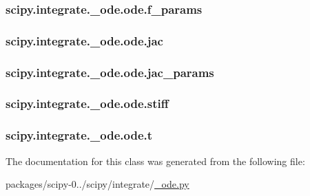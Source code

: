 \subsubsection[{f\+\_\+params}]{\setlength{\rightskip}{0pt plus 5cm}scipy.\+integrate.\+\_\+ode.\+ode.\+f\+\_\+params}\label{classscipy_1_1integrate_1_1__ode_1_1ode_a43a6b1b3c7f876449e3721dce0c58296}
\hypertarget{classscipy_1_1integrate_1_1__ode_1_1ode_ae8cbb591c6c002c709eb845b3b8188bd}{}
\subsubsection[{jac}]{\setlength{\rightskip}{0pt plus 5cm}scipy.\+integrate.\+\_\+ode.\+ode.\+jac}\label{classscipy_1_1integrate_1_1__ode_1_1ode_ae8cbb591c6c002c709eb845b3b8188bd}
\hypertarget{classscipy_1_1integrate_1_1__ode_1_1ode_a73985726afe87adb6139fcd1a6a3ade8}{}
\subsubsection[{jac\+\_\+params}]{\setlength{\rightskip}{0pt plus 5cm}scipy.\+integrate.\+\_\+ode.\+ode.\+jac\+\_\+params}\label{classscipy_1_1integrate_1_1__ode_1_1ode_a73985726afe87adb6139fcd1a6a3ade8}
\hypertarget{classscipy_1_1integrate_1_1__ode_1_1ode_a680032936169fe91fd3e43f209860e26}{}
\subsubsection[{stiff}]{\setlength{\rightskip}{0pt plus 5cm}scipy.\+integrate.\+\_\+ode.\+ode.\+stiff}\label{classscipy_1_1integrate_1_1__ode_1_1ode_a680032936169fe91fd3e43f209860e26}
\hypertarget{classscipy_1_1integrate_1_1__ode_1_1ode_a68add56e453a1a3b5776695f1cbe61d1}{}
\subsubsection[{t}]{\setlength{\rightskip}{0pt plus 5cm}scipy.\+integrate.\+\_\+ode.\+ode.\+t}\label{classscipy_1_1integrate_1_1__ode_1_1ode_a68add56e453a1a3b5776695f1cbe61d1}


The documentation for this class was generated from the following file\+:\begin{DoxyCompactItemize}
\item 
packages/scipy-\/0../scipy/integrate/\hyperlink{__ode_8py}{\+\_\+ode.\+py}\end{DoxyCompactItemize}
